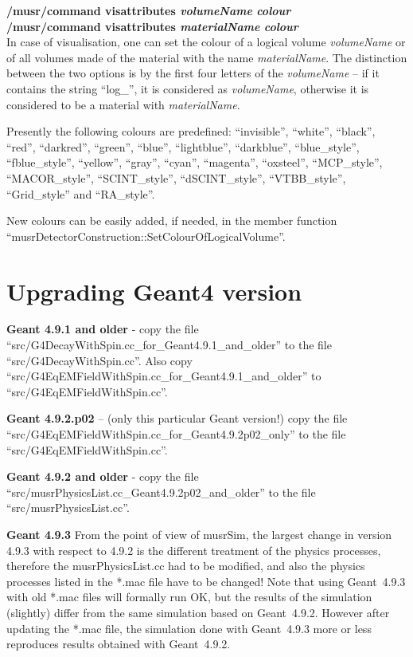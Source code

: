 \documentclass[twoside]{dis04}
\begin{document}
\begin{description}
\item{\bf /musr/command visattributes \emph{volumeName} \emph{colour}}\\
     {\bf /musr/command visattributes \emph{materialName} \emph{colour}}\\
	In case of visualisation,	
	one can set the colour of a logical volume \emph{volumeName} or of all volumes made
	of the material with the name \emph{materialName}.  The distinction between the
	two options is by the first four letters of the \emph{volumeName} -- if it contains
	the string ``log\_'', it is considered as \emph{volumeName}, otherwise it is
	considered to be a material with \emph{materialName}.

	Presently the following colours are predefined: ``invisible'', ``white'', ``black'', 
	``red'', ``darkred'', ``green'', 
	``blue'', ``lightblue'', ``darkblue'', ``blue\_style'', ``fblue\_style'',
	``yellow'', ``gray'', ``cyan'', ``magenta'',
	``oxsteel'', ``MCP\_style'', ``MACOR\_style'', ``SCINT\_style'',
	``dSCINT\_style'', ``VTBB\_style'', ``Grid\_style'' and ``RA\_style''.

	New colours can be easily added, if needed, in the member function
	``musrDetectorConstruction::SetColourOfLogicalVolume''.

\end{description}
\section{Upgrading Geant4 version}
\begin{description}
\item{\bf Geant 4.9.1 and older} - copy the file ``src/G4DecayWithSpin.cc\_for\_Geant4.9.1\_and\_older''
    to the file ``src/G4DecayWithSpin.cc''.  
    Also copy ``src/G4EqEMFieldWithSpin.cc\_for\_Geant4.9.1\_and\_older'' to ``src/G4EqEMFieldWithSpin.cc''.
\item{\bf Geant 4.9.2.p02} -- (only this particular Geant version!) copy the file 
    ``src/G4EqEMFieldWithSpin.cc\_for\_Geant4.9.2p02\_only'' to the file ``src/G4EqEMFieldWithSpin.cc''.
\item{\bf Geant 4.9.2 and older} - copy the file ``src/musrPhysicsList.cc\_Geant4.9.2p02\_and\_older''
    to the file ``src/musrPhysicsList.cc''.
\item{\bf Geant 4.9.3}
    From the point of view of musrSim, the largest change in version 4.9.3 with respect to 4.9.2 
    is the different treatment of the physics processes, therefore the musrPhysicsList.cc had to be
    modified, and also the physics processes listed in the *.mac file have to be changed!
    Note that using Geant~4.9.3 with old *.mac files will formally run OK, but the results of the
    simulation (slightly) differ from the same simulation based on Geant~4.9.2.  However after
    updating the *.mac file, the simulation done with Geant~4.9.3 more or less reproduces results 
    obtained with Geant~4.9.2.
\end{description}
\end{document}

